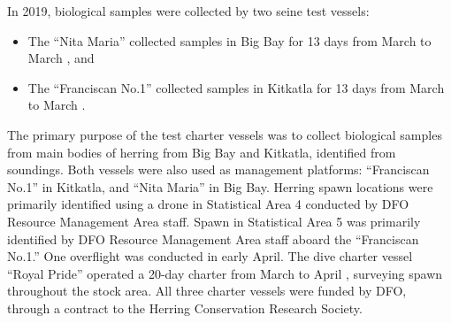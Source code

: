 In 2019, biological samples were collected by two seine test vessels:
\begin{itemize}
\item The ``Nita Maria'' collected samples in Big Bay for 13 days from March  to March , and
\item The ``Franciscan No.1'' collected samples in Kitkatla for 13 days from March  to March .
\end{itemize}
The primary purpose of the test charter vessels was to collect biological samples from main bodies of herring from Big Bay and Kitkatla, identified from soundings.
Both vessels were also used as management platforms: ``Franciscan No.1'' in Kitkatla, and ``Nita Maria'' in Big Bay. 
Herring spawn locations were primarily identified using a drone in Statistical Area 4 conducted by DFO Resource Management Area staff.
Spawn in Statistical Area 5 was primarily identified by DFO Resource Management Area staff aboard the ``Franciscan No.1.''
One overflight was conducted in early April.
The dive charter vessel ``Royal Pride'' operated a 20-day charter from March  to April , surveying spawn throughout the stock area.
All three charter vessels were funded by DFO, through a contract to the Herring Conservation Research Society.